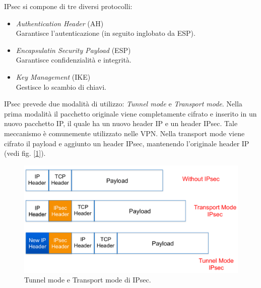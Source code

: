 \documentclass[a4paper, 11pt, twoside, openright, fleqn]{report}
\begin{document}
\noindent
IPsec si compone di tre diversi protocolli:
\begin{itemize}
	\item \emph{Authentication Header} (AH)\\
	Garantisce l'autenticazione (in seguito inglobato da ESP).
	\item \emph{Encapsulatin Security Payload} (ESP)\\
	Garantisce confidenzialità e integrità.
	\item \emph{Key Management} (IKE)\\
	Gestisce lo scambio di chiavi.
\end{itemize}
IPsec prevede due modalità di utilizzo: \emph{Tunnel mode} e \emph{Transport mode}. Nella prima modalità il pacchetto originale viene completamente cifrato e inserito in un nuovo pacchetto IP, il quale ha un nuovo header IP e un header IPsec. Tale meccanismo è comunemente utilizzato nelle VPN. Nella transport mode viene cifrato il payload e aggiunto un header IPsec, mantenendo l'originale header IP (vedi fig. [\ref{fig:tunneltransport}]).
\begin{figure}[htp]
	\centering
	\includegraphics[width=.9\textwidth]{images/TunnelTransport}
	\caption{Tunnel mode e Transport mode di IPsec.}\label{fig:tunneltransport}
\end{figure}
\end{document}
